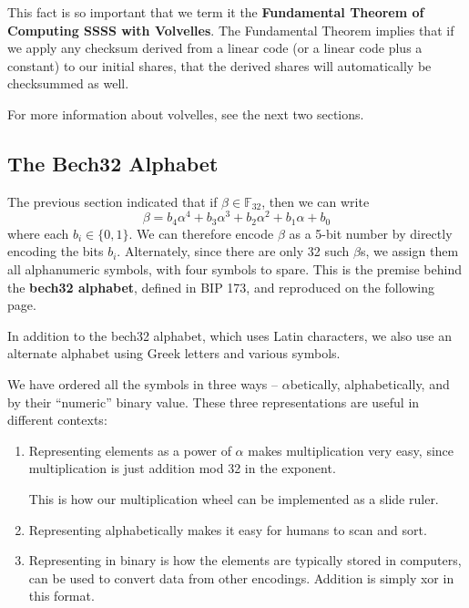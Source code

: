 \documentclass[letterpaper]{article}
\theoremstyle{xxx}
\theoremstyle{evil}
\theoremstyle{yyy}
\theoremstyle{plain}
\theoremstyle{zzz}
\newcommand{\fttwo}{\mathbb{F}_{32}}
\begin{document}
This fact is so important that we term it the \textbf{Fundamental Theorem of
Computing SSSS with Volvelles}. The Fundamental Theorem implies that if we
apply any checksum derived from a linear code (or a linear code plus a
constant) to our initial shares, that the derived shares will automatically
be checksummed as well.

For more information about volvelles, see the next two sections.

\subsection{The Bech32 Alphabet}

The previous section indicated that if $\beta\in\fttwo$, then we can write
\[ \beta = b_4\alpha^4 + b_3\alpha^3 + b_2\alpha^2 + b_1\alpha + b_0 \]
where each $b_i\in\{0, 1\}$. We can therefore encode $\beta$ as a 5-bit
number by directly encoding the bits $b_i$. Alternately, since there are
only 32 such $\beta$s, we assign them all alphanumeric symbols, with four
symbols to spare. This is the premise behind the \textbf{bech32 alphabet},
defined in BIP 173, and reproduced on the following page.

In addition to the bech32 alphabet, which uses Latin characters, we also use
an alternate alphabet using Greek letters and various symbols.

We have ordered all the symbols in three ways -- $\alpha$betically,
alphabetically, and by their ``numeric'' binary value. These three
representations are useful in different contexts:
\begin{enumerate}
\item Representing elements as a power of $\alpha$ makes multiplication
very easy, since multiplication is just addition mod 32 in the exponent.

This is how our multiplication wheel can be implemented as a slide ruler.
\item Representing alphabetically makes it easy for humans to scan and sort.
\item Representing in binary is how the elements are typically stored in
computers, can be used to convert data from other encodings. Addition is
simply xor in this format.
\end{enumerate}

\clearpage
~\\~\\~\\~\\ %
\end{document}
